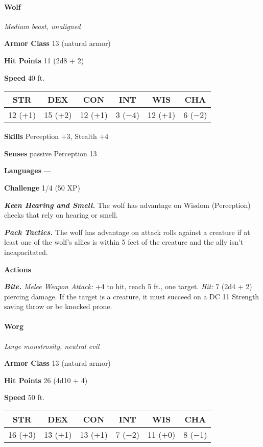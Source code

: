 \documentclass[
]{article}
\begin{document}
\hypertarget{wolf}{%
\paragraph{Wolf}\label{wolf}}

\emph{Medium beast, unaligned}

\textbf{Armor Class} 13 (natural armor)

\textbf{Hit Points} 11 (2d8 + 2)

\textbf{Speed} 40 ft.

\begin{longtable}[]{@{}cccccc@{}}
\toprule
STR & DEX & CON & INT & WIS & CHA\tabularnewline
\midrule
\endhead
12 (+1) & 15 (+2) & 12 (+1) & 3 (−4) & 12 (+1) & 6 (−2)\tabularnewline
\bottomrule
\end{longtable}

\textbf{Skills} Perception +3, Stealth +4

\textbf{Senses} passive Perception 13

\textbf{Languages} ---

\textbf{Challenge} 1/4 (50 XP)

\emph{\textbf{Keen Hearing and Smell.}} The wolf has advantage on Wisdom
(Perception) checks that rely on hearing or smell.

\emph{\textbf{Pack Tactics.}} The wolf has advantage on attack rolls
against a creature if at least one of the wolf's allies is within 5 feet
of the creature and the ally isn't incapacitated.

\textbf{Actions}

\emph{\textbf{Bite.}} \emph{Melee Weapon Attack:} +4 to hit, reach 5
ft., one target. \emph{Hit:} 7 (2d4 + 2) piercing damage. If the target
is a creature, it must succeed on a DC 11 Strength saving throw or be
knocked prone.

\hypertarget{worg}{%
\paragraph{Worg}\label{worg}}

\emph{Large monstrosity, neutral evil}

\textbf{Armor Class} 13 (natural armor)

\textbf{Hit Points} 26 (4d10 + 4)

\textbf{Speed} 50 ft.

\begin{longtable}[]{@{}cccccc@{}}
\toprule
STR & DEX & CON & INT & WIS & CHA\tabularnewline
\midrule
\endhead
16 (+3) & 13 (+1) & 13 (+1) & 7 (−2) & 11 (+0) & 8 (−1)\tabularnewline
\bottomrule
\end{longtable}
\end{document}
